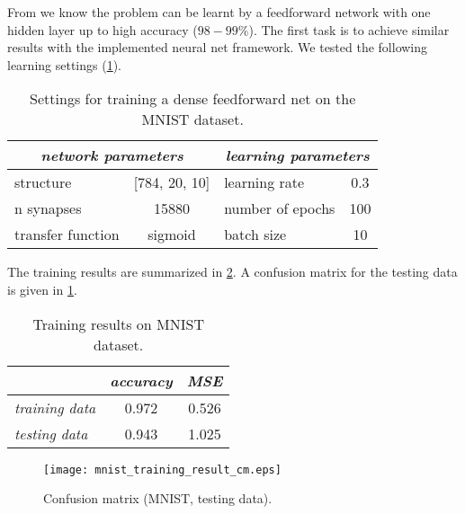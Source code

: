 From \citep{online:mnist} we know the problem can be learnt by a feedforward network with one hidden layer up to high accuracy ($ 98-99\% $). The first task is to achieve similar results with the implemented neural net framework. We tested the following learning settings (\cref{tab:examples:mnist_training_settings}).

\begin{table}[H]
\centering
\begin{tabular}{|l|c|l|c|}
\hline
\multicolumn{2}{|c|}{\textit{network parameters}} & \multicolumn{2}{c|}{\textit{learning parameters}} \\ \hline
structure               & {[}784, 20, 10{]}       & learning rate                  & 0.3              \\ \hline
n synapses              & 15880                   & number of epochs               & 100              \\ \hline
transfer function       & sigmoid                 & batch size               & 10              \\ \hline
\end{tabular}
\caption{Settings for training a dense feedforward net on the MNIST dataset.}
\label{tab:examples:mnist_training_settings}
\end{table}

The training results are summarized in \cref{tab:examples:mnist_training_results}. A confusion matrix for the testing data is given in \cref{fig:examples:mnist_cm}.

\begin{table}[H]
\centering
\begin{tabular}{|l|c|c|}
\hline
                       & \multicolumn{1}{l|}{\textit{accuracy}} & \multicolumn{1}{l|}{\textit{MSE}} \\ \hline
\textit{training data} & 0.972                                      & 0.526                                 \\ \hline
\textit{testing data}  & 0.943                                     & 1.025                                 \\ \hline
\end{tabular}
\caption{Training results on MNIST dataset.}
\label{tab:examples:mnist_training_results}
\end{table}

\begin{figure}[H]
\centering
\texttt{[image: mnist\_training\_result\_cm.eps]}
\caption{Confusion matrix (MNIST, testing data).}
\label{fig:examples:mnist_cm}
\end{figure}

